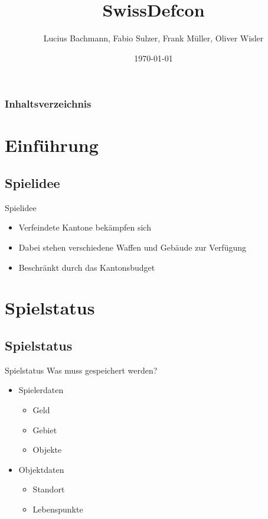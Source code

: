 \documentclass[12pt, utf8]{beamer}
\author{Lucius Bachmann, Fabio Sulzer, Frank Müller, Oliver Wisler}
\title{SwissDefcon}
\date{\today}
\begin{document}
\begin{frame}
\titlepage
\end{frame}

\begin{frame}
	\frametitle{Inhaltsverzeichnis}
	\setcounter{tocdepth}{1}
	\tableofcontents
\end{frame}


\section{Einführung}
\subsection{Spielidee}
\begin{frame}{Spielidee}
\begin{itemize}
\item Verfeindete Kantone bekämpfen sich
\item Dabei stehen verschiedene Waffen und Gebäude zur Verfügung
\item Beschränkt durch das Kantonsbudget
\end{itemize}
\end{frame}

\section{Spielstatus}

\subsection{Spielstatus}
\begin{frame}{Spielstatus}
Was muss gespeichert werden?
\begin{multicols}{2}
\begin{itemize}
\item  Spielerdaten 
	\begin{itemize}
		\item Geld
		\item Gebiet
		\item Objekte
	\end{itemize}
\item Objektdaten
	\begin{itemize}
		\item Standort
		\item Lebenspunkte
	\end{itemize}
\end{itemize}
\end{multicols}
\end{frame}
\end{document}
